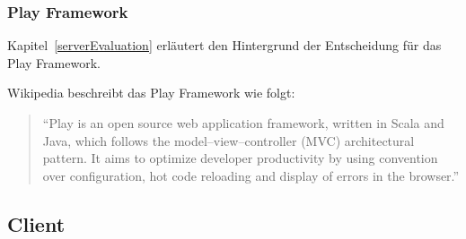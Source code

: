 		\subsubsection{Play Framework}
			Kapitel~\ref{serverEvaluation} erläutert den Hintergrund der Entscheidung für das Play Framework. 
			
			Wikipedia beschreibt das Play Framework wie folgt:
			\begin{quote}
				"`Play is an open source web application framework, written in Scala and Java, which follows the model–view–controller (MVC) architectural pattern. It aims to optimize developer productivity by using convention over configuration, hot code reloading and display of errors in the browser."'\cite{builtwith_pty_ltd_framework_2014}
			\end{quote}

			

	\subsection{Client}
